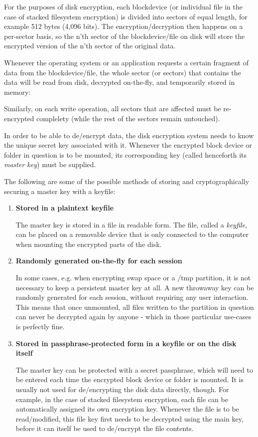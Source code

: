 For the purposes of disk encryption, each blockdevice (or individual file in the case of stacked filesystem encryption) is divided into sectors of equal length, for example 512 bytes (4,096 bits). The encryption/decryption then happens on a per-sector basis, so the n'th sector of the blockdevice/file on disk will store the encrypted version of the n'th sector of the original data.

Whenever the operating system or an application requests a certain fragment of data from the blockdevice/file, the whole sector (or sectors) that contains the data will be read from disk, decrypted on-the-fly, and temporarily stored in memory:

Similarly, on each write operation, all sectors that are affected must be re-encrypted complelety (while the rest of the sectors remain untouched).

In order to be able to de/encrypt data, the disk encryption system needs to know the unique secret key associated with it. Whenever the encrypted block device or folder in question is to be mounted, its corresponding key (called henceforth its \textit{master key}) must be supplied.

The following are some of the possible methods of storing and cryptographically securing a master key with a keyfile\cite{disk-enc}:
\begin{enumerate}
\item \textbf{Stored in a plaintext keyfile}

The master key is stored in a file in readable form. The file, called a \textit{keyfile}, can be placed on a removable device that is only connected to the computer when mounting the encrypted parts of the disk.

\item \textbf{Randomly generated on-the-fly for each session}

In some cases, e.g. when encrypting swap space or a /tmp partition, it is not necessary to keep a persistent master key at all. A new throwaway key can be randomly generated for each session, without requiring any user interaction. This means that once unmounted, all files written to the partition in question can never be decrypted again by anyone - which in those particular use-cases is perfectly fine.

\item \textbf{Stored in passphrase-protected form in a keyfile or on the disk itself}

The master key can be protected with a secret passphrase, which will need to be entered each time the encrypted block device or folder is mounted.
It is usually not used for de/encrypting the disk data directly, though. For example, in the case of stacked filesystem encryption, each file can be automatically assigned its own encryption key. Whenever the file is to be read/modified, this file key first needs to be decrypted using the main key, before it can itself be used to de/encrypt the file contents.

\end{enumerate}

